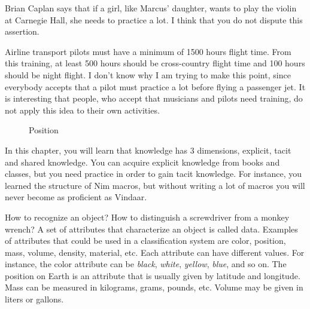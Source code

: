 \documentclass[
  12pt,
]{book}
\begin{document}
Brian Caplan says that if a girl, like Marcus' daughter, wants to play
the violin at Carnegie Hall, she needs to practice a lot. I think that
you do not dispute this assertion.

Airline transport pilots must have a minimum of 1500 hours flight time.
From this training, at least 500 hours should be cross-country flight
time and 100 hours should be night flight. I don't know why I am trying
to make this point, since everybody accepts that a pilot must practice a
lot before flying a passenger jet. It is interesting that people, who
accept that musicians and pilots need training, do not apply this idea
to their own activities.

\begin{figure}
\caption{Position}
\label{fig:position}
\end{figure}

In this chapter, you will learn that knowledge has 3 dimensions,
explicit, tacit and shared knowledge. You can acquire explicit knowledge
from books and classes, but you need practice in order to gain tacit
knowledge. For instance, you learned the structure of Nim macros, but
without writing a lot of macros you will never become as proficient as
Vindaar.

How to recognize an object? How to distinguish a screwdriver from a
monkey wrench? A set of attributes that characterize an object is called
data. Examples of attributes that could be used in a classification
system are color, position, mass, volume, density, material, etc. Each
attribute can have different values. For instance, the color attribute
can be \emph{black}, \emph{white}, \emph{yellow}, \emph{blue}, and so
on. The position on Earth is an attribute that is usually given by
latitude and longitude. Mass can be measured in kilograms, grams,
pounds, etc. Volume may be given in liters or gallons.
\end{document}
